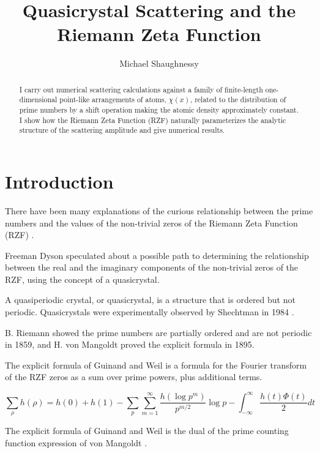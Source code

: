 \documentclass[11pt, oneside]{article}
\title{Quasicrystal Scattering and the Riemann Zeta Function}
\author{Michael Shaughnessy}
\begin{document}
\maketitle

\begin{abstract}
I carry out numerical scattering calculations against a family of finite-length one-dimensional point-like arrangements of atoms, $\chi(x)$, related to the distribution of prime numbers by a shift operation making the atomic density approximately constant. 
I show how the Riemann Zeta Function (RZF) naturally parameterizes the analytic structure of the scattering amplitude and give numerical results.
\end{abstract}

\section{Introduction}

There have been many explanations of the curious relationship between the prime numbers and the values of the non-trivial zeros of the Riemann Zeta Function (RZF) \cite{Riemann1859, Selberg1956, Dyson2009, Zhang2014}.

Freeman Dyson \cite{Baez2013} speculated about a possible path to determining the relationship between the real and the imaginary components of the non-trivial zeros of the RZF, using the concept of a quasicrystal.

A quasiperiodic crystal, or quasicrystal, is a structure that is ordered but not periodic. Quasicrystals were experimentally observed by Shechtman in 1984 \cite{Shectman1984}. 

B. Riemann showed the prime numbers are partially ordered and are not periodic \cite{Riemann1859} in 1859, and H. von Mangoldt \cite{VonMangoldt1895} proved the explicit formula in 1895.

The explicit formula of Guinand and Weil \cite{Weil} is a formula for the Fourier transform of the RZF zeros as a sum over prime powers, plus additional terms.  

\begin{equation}
\sum_{\rho} h(\rho) = h(0) + h(1) - \sum_{p} \sum_{m=1}^{\infty} \frac{h(\log p^m)}{p^{m/2}} \log p - \int_{-\infty}^{\infty} \frac{h(t) \Phi(t)}{2} dt
\end{equation}

The explicit formula of Guinand and Weil is the dual of the prime counting function expression of von Mangoldt \cite{VonMangoldt1895}.
\end{document}
